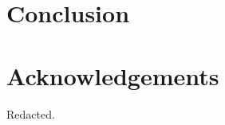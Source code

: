 \documentclass{article}
\begin{document}
    
    
\section{Conclusion}
    

\section{Acknowledgements}
Redacted.
\printbibliography 
\end{document}
